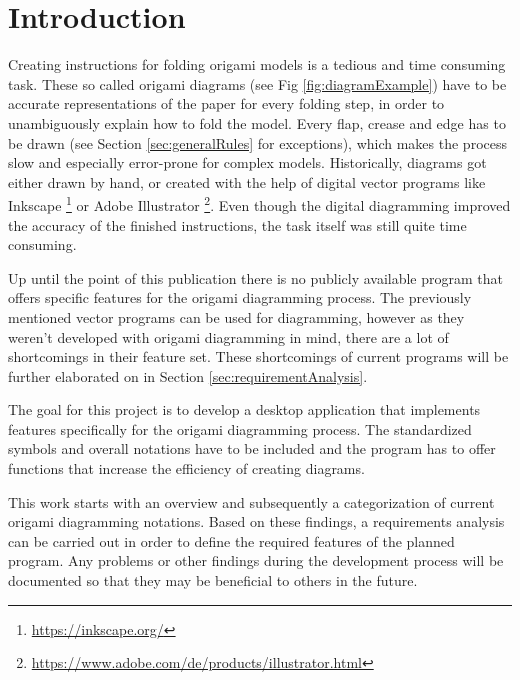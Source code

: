 
\section{Introduction}
\label{sec:introduction}





Creating instructions for folding \gls{origami} models is a tedious and time consuming task. These so called origami diagrams (see Fig \ref{fig:diagramExample}) have to be accurate representations of the paper for every folding step, in order to unambiguously explain how to fold the model. Every flap, crease and edge has to be drawn (see Section \ref{sec:generalRules} for exceptions), which makes the process slow and especially error-prone for complex models.
Historically, diagrams got either drawn by hand, or created with the help of digital vector programs like Inkscape \footnote{\url{https://inkscape.org/}} or Adobe Illustrator \footnote{\url{https://www.adobe.com/de/products/illustrator.html}}. Even though the digital diagramming improved the accuracy of the finished instructions, the task itself was still quite time consuming.\cite{???}

Up until the point of this publication there is no publicly available program that offers specific features for the origami diagramming process. The previously mentioned vector programs can be used for diagramming, however as they weren't developed with origami diagramming in mind, there are a lot of shortcomings in their feature set. These shortcomings of current programs will be further elaborated on in Section \ref{sec:requirementAnalysis}.

The goal for this project is to develop a desktop application that implements features specifically for the origami diagramming process. The standardized symbols and overall notations have to be included and the program has to offer functions that increase the efficiency of creating diagrams.

This work starts with an overview and subsequently a categorization of current origami diagramming notations. Based on these findings, a requirements analysis can be carried out in order to define the required features of the planned program. Any problems or other findings during the development process will be documented so that they may be beneficial to others in the future.